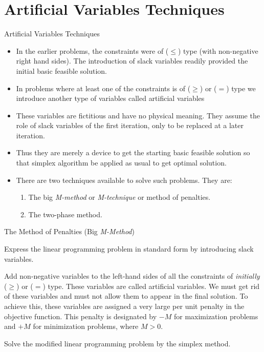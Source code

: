 \section{Artificial Variables Techniques}
\label{sec:artificial-variables}


\begin{frame}{Artificial Variables Techniques}
  \begin{itemize} \parskip3mm \justifying
  \item<only@1> In the earlier problems, the constraints were of ($\leq$) type (with non-negative right hand sides). The introduction of slack variables readily provided the initial basic feasible solution.
  \item<only@1> In problems where at least one of \alert{the constraints is of ($\geq$) or ($=$) type} we introduce another type of variables called \alert{artificial variables} 
  \item<only@1> These variables are fictitious and have no physical meaning. They assume the role of slack variables of the first iteration, only to be replaced at a later iteration.
  \item<only@2> Thus they are merely a device to get the starting basic feasible solution so that simplex algorithm be applied as usual to get optimal solution.
  \item<only@2> There are two techniques available to solve such problems. They are: 
    \begin{enumerate}
    \item The big \emph{M-method} or \emph{M-technique} or \alert{method of penalties}.
    \item \alert{The two-phase method}.
    \end{enumerate}
  \end{itemize}
\end{frame}

\begin{frame}{The Method of Penalties (Big \emph{M-Method})}
  \begin{description} \justifying \parskip4mm
  \item[Step 1.] Express the linear programming problem in standard form by introducing slack variables.
  \item[Step 2.] Add non-negative variables to the left-hand sides of all the constraints of \emph{initially} ($\geq$) or ($=$) type. These variables are called \alert{artificial variables}. We must get rid of these variables and must not allow them to appear in the final solution. To achieve this, these variables are assigned a very large per unit penalty in the objective function. This penalty is designated by \alert{$-M$ for maximization problems and $+M$ for minimization problems}, where $M > 0$.
  \item[Step 3.] Solve the modified linear programming problem by the simplex method.
  \end{description}
\end{frame}

